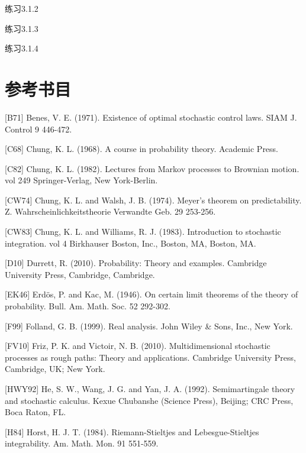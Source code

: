 \begin{namedthm}{练习3.1.2}
    
\end{namedthm}

\begin{namedthm}{练习3.1.3}
    
\end{namedthm}

\begin{namedthm}{练习3.1.4}
    
\end{namedthm}




\section*{参考书目}
[B71] Benes, V. E. (1971). Existence of optimal stochastic control laws. SIAM J. Control 9 446-472.

[C68] Chung, K. L. (1968). A course in probability theory. Academic Press.

[C82] Chung, K. L. (1982). Lectures from Markov processes to Brownian motion. vol 249 Springer-Verlag, New York-Berlin.

[CW74] Chung, K. L. and Walsh, J. B. (1974). Meyer's theorem on predictability. Z. Wahrscheinlichkeitstheorie Verwandte Geb. 29 253-256.

[CW83] Chung, K. L. and Williams, R. J. (1983). Introduction to stochastic integration. vol 4 Birkhauser Boston, Inc., Boston, MA, Boston, MA.

[D10] Durrett, R. (2010). Probability: Theory and examples. Cambridge University Press, Cambridge, Cambridge.

[EK46] Erdös, P. and Kac, M. (1946). On certain limit theorems of the theory of probability. Bull. Am. Math. Soc. 52 292-302.

[F99] Folland, G. B. (1999). Real analysis. John Wiley \& Sons, Inc., New York.

[FV10] Friz, P. K. and Victoir, N. B. (2010). Multidimensional stochastic processes as rough paths: Theory and applications. Cambridge University Press, Cambridge, UK; New York.

[HWY92] He, S. W., Wang, J. G. and Yan, J. A. (1992). Semimartingale theory and stochastic calculus. Kexue Chubanshe (Science Press), Beijing; CRC Press, Boca Raton, FL.

[H84] Horst, H. J. T. (1984). Riemann-Stieltjes and Lebesgue-Stieltjes integrability. Am. Math. Mon. 91 551-559.

